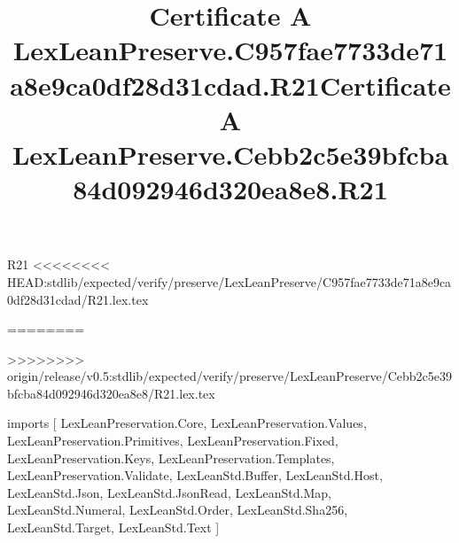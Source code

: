 \begin{lexlean}{R21}
<<<<<<<< HEAD:stdlib/expected/verify/preserve/LexLeanPreserve/C957fae7733de71a8e9ca0df28d31cdad/R21.lex.tex
\title{Certificate A LexLeanPreserve.C957fae7733de71a8e9ca0df28d31cdad.R21}
========
\title{Certificate A LexLeanPreserve.Cebb2c5e39bfcba84d092946d320ea8e8.R21}
>>>>>>>> origin/release/v0.5:stdlib/expected/verify/preserve/LexLeanPreserve/Cebb2c5e39bfcba84d092946d320ea8e8/R21.lex.tex
\begin{coremodule}
imports [
  LexLeanPreservation.Core,
  LexLeanPreservation.Values,
  LexLeanPreservation.Primitives,
  LexLeanPreservation.Fixed,
  LexLeanPreservation.Keys,
  LexLeanPreservation.Templates,
  LexLeanPreservation.Validate,
  LexLeanStd.Buffer,
  LexLeanStd.Host,
  LexLeanStd.Json,
  LexLeanStd.JsonRead,
  LexLeanStd.Map,
  LexLeanStd.Numeral,
  LexLeanStd.Order,
  LexLeanStd.Sha256,
  LexLeanStd.Target,
  LexLeanStd.Text
]


\end{coremodule}
\end{lexlean}
